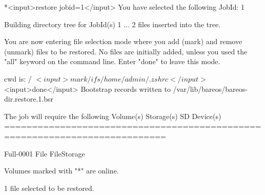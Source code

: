 \begin{bconsole}{}
*<input>restore jobid=1</input>
You have selected the following JobId: 1

Building directory tree for JobId(s) 1 ...
2 files inserted into the tree.

You are now entering file selection mode where you add (mark) and
remove (unmark) files to be restored. No files are initially added, unless
you used the "all" keyword on the command line.
Enter "done" to leave this mode.

cwd is: /
$ <input>mark /ifs/home/admin/.zshrc</input>
$ <input>done</input>
Bootstrap records written to /var/lib/bareos/bareos-dir.restore.1.bsr

The job will require the following
   Volume(s)                 Storage(s)                SD Device(s)
===========================================================================

    Full-0001                 File                      FileStorage

Volumes marked with "*" are online.


1 file selected to be restored.


\end{bconsole}
